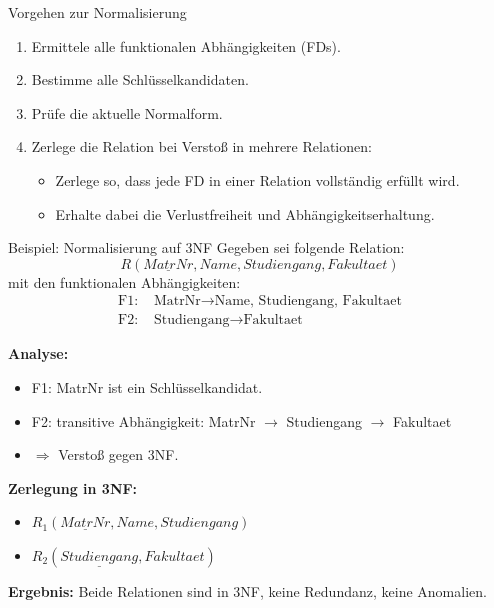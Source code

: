 \documentclass{article}
\begin{document}
\begin{block}{Vorgehen zur Normalisierung}
\begin{enumerate}
  \item Ermittele alle funktionalen Abhängigkeiten (FDs).
  \item Bestimme alle Schlüsselkandidaten.
  \item Prüfe die aktuelle Normalform.
  \item Zerlege die Relation bei Verstoß in mehrere Relationen:
  \begin{itemize}
    \item Zerlege so, dass jede FD in einer Relation vollständig erfüllt wird.
    \item Erhalte dabei die Verlustfreiheit und Abhängigkeitserhaltung.
  \end{itemize}
\end{enumerate}
\end{block}

\begin{block}{Beispiel: Normalisierung auf 3NF}
Gegeben sei folgende Relation:
\[
R(\underline{MatrNr}, Name, Studiengang, Fakultaet)
\]
mit den funktionalen Abhängigkeiten:
\begin{align*}
\text{F1: } & \text{MatrNr} \rightarrow \text{Name, Studiengang, Fakultaet} \\
\text{F2: } & \text{Studiengang} \rightarrow \text{Fakultaet}
\end{align*}

\textbf{Analyse:}
\begin{itemize}
  \item F1: MatrNr ist ein Schlüsselkandidat.
  \item F2: transitive Abhängigkeit: MatrNr $\rightarrow$ Studiengang $\rightarrow$ Fakultaet
  \item $\Rightarrow$ Verstoß gegen 3NF.
\end{itemize}

\textbf{Zerlegung in 3NF:}
\begin{itemize}
  \item $R_1(\underline{MatrNr}, Name, Studiengang)$
  \item $R_2(\underline{Studiengang}, Fakultaet)$
\end{itemize}

\textbf{Ergebnis:} Beide Relationen sind in 3NF, keine Redundanz, keine Anomalien.
\end{block}
\end{document}

